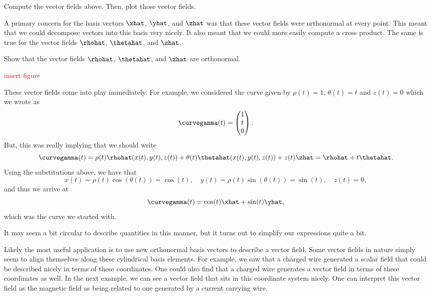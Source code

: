 \begin{exercise}
    Compute the vector fields above. Then, plot those vector fields.
\end{exercise}

A primary concern for the basis vectors $\xhat$, $\yhat$, and $\zhat$ was that these vector fields were orthonormal at every point. This meant that we could decompose vectors into this basis very nicely.  It also meant that we could more easily compute a cross product.  The same is true for the vector fields $\rhohat$, $\thetahat$, and $\zhat$.  

\begin{exercise}
    Show that the vector fields $\rhohat$, $\thetahat$, and $\zhat$ are orthonormal.
\end{exercise}

\textcolor{red}{insert figure}

These vector fields come into play immediately. For example, we considered the curve given by $\rho(t)=1$, $\theta(t)=t$ and $z(t)=0$ which we wrote as
\[
\curvegamma(t) = \begin{pmatrix} 1 \\ t \\ 0 \end{pmatrix}.
\]
But, this was really implying that we should write
\[
\curvegamma(t) = \rho(t)\rhohat(x(t),y(t),z(t)) + \theta(t)\thetahat(x(t),y(t),z(t))+z(t)\zhat = \rhohat + t\thetahat.
\]
Using the substitutions above, we have that
\[
x(t) = \rho(t)\cos(\theta(t)) = \cos(t), \quad y(t) = \rho(t)\sin(\theta(t))=\sin(t), \quad z(t)=0,
\]
and thus we arrive at
\[
\curvegamma(t) = \cos(t)\xhat + \sin(t)\yhat,
\]
which was the curve we started with.

\begin{remark}
It may seem a bit circular to describe quantities in this manner, but it turns out to simplify our expressions quite a bit.
\end{remark}

Likely the most useful application is to use new orthonormal basis vectors to describe a vector field.  Some vector fields in nature simply seem to align themselves along these cylindrical basis elements.  For example, we saw that a charged wire generated a scalar field that could be described nicely in terms of these coordinates.  One could also find that a charged wire generates a vector field in terms of these coordinates as well. In the next example, we can see a vector field that sits in this coordinate system nicely.  One can interpret this vector field as the magnetic field as being related to one generated by a current carrying wire.


